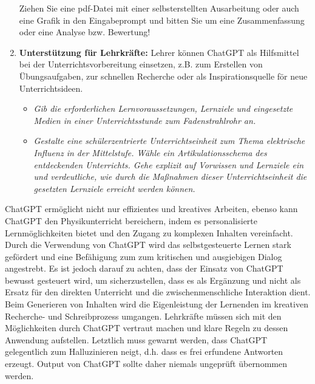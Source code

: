 \begin{enumerate}
	\begin{beisp} 
	Ziehen Sie eine pdf-Datei mit einer selbsterstellten Ausarbeitung oder auch eine Grafik in den Eingabeprompt und bitten Sie um eine Zusammenfassung oder eine Analyse bzw. Bewertung!
	\end{beisp}
	
	
\item \textbf{Unterst\"{u}tzung f\"{u}r Lehrkr\"{a}fte:} Lehrer k\"{o}nnen ChatGPT als Hilfsmittel bei der Unterrichtsvorbereitung einsetzen, z.B. zum Erstellen von \"{U}bungsaufgaben, zur schnellen Recherche oder als Inspirationsquelle f\"{o}r neue Unterrichtsideen. 
	\begin{beisp2}
	\begin{itemize}
	\item {\glqq}\emph{Gib die erforderlichen Lernvoraussetzungen, Lernziele und eingesetzte Medien in einer Unterrichtsstunde zum Fadenstrahlrohr an.}{\grqq} 
	\item {\glqq}\emph{Gestalte eine sch\"{u}lerzentrierte Unterrichtseinheit zum Thema elektrische Influenz in der Mittelstufe. W\"{a}hle ein Artikulationsschema des entdeckenden Unterrichts. Gehe explizit auf Vorwissen und Lernziele ein und verdeutliche, wie durch die Ma{\ss}nahmen dieser Unterrichtseinheit die gesetzten Lernziele erreicht werden k\"{o}nnen.}{\grqq} 
	\end{itemize}
	\end{beisp2}
\end{enumerate}
\bip

ChatGPT erm\"{o}glicht  nicht nur effizientes und kreatives Arbeiten, ebenso kann ChatGPT  den Physikunterricht bereichern, indem es personalisierte Lernm\"{o}glichkeiten bietet  und den Zugang zu komplexen Inhalten vereinfacht. Durch die Verwendung von ChatGPT wird das selbstgesteuerte Lernen stark gef\"{o}rdert und eine Bef\"{a}higung zum zum kritischen und ausgiebigen Dialog angestrebt.
\mip
Es ist jedoch darauf zu achten, dass der Einsatz von ChatGPT bewusst gesteuert wird, um sicherzustellen, dass es als Erg\"{a}nzung und nicht als Ersatz f\"{u}r den direkten Unterricht und die zwischenmenschliche Interaktion dient. Beim Generieren von Inhalten wird die Eigenleistung der Lernenden im kreativen Recherche- und Schreibprozess umgangen. Lehrkr\"{a}fte m\"{u}ssen sich mit den M\"{o}glichkeiten durch ChatGPT vertraut machen und klare Regeln zu dessen Anwendung aufstellen.
\mip
Letztlich muss gewarnt werden, dass ChatGPT gelegentlich zum {\glqq}Halluzinieren{\grqq} neigt, d.h. dass es frei erfundene Antworten erzeugt. Output von ChatGPT sollte daher niemals  ungepr\"{u}ft \"{u}bernommen werden. 


